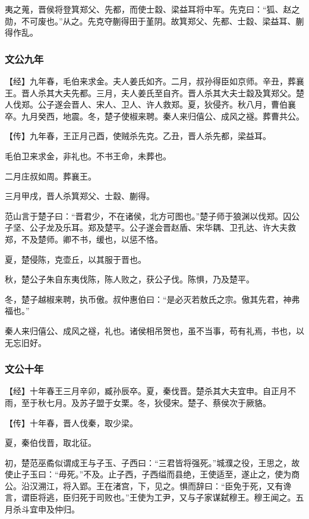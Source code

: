 \documentclass[]{article}
\begin{document}
夷之蒐，晋侯将登箕郑父、先都，而使士縠、梁益耳将中军。先克曰：``狐、赵之勋，不可废也。''从之。先克夺蒯得田于堇阴。故箕郑父、先都、士縠、梁益耳、蒯得作乱。

\hypertarget{header-n1149}{%
\subsubsection{文公九年}\label{header-n1149}}

【经】九年春，毛伯来求金。夫人姜氏如齐。二月，叔孙得臣如京师。辛丑，葬襄王。晋人杀其大夫先都。三月，夫人姜氏至自齐。晋人杀其大夫士縠及箕郑父。楚人伐郑。公子遂会晋人、宋人、卫人、许人救郑。夏，狄侵齐。秋八月，曹伯襄卒。九月癸西，地震。冬，楚子使椒来聘。秦人来归僖公、成风之襚。葬曹共公。

【传】九年春，王正月己酉，使贼杀先克。乙丑，晋人杀先都，梁益耳。

毛伯卫来求金，非礼也。不书王命，未葬也。

二月庄叔如周。葬襄王。

三月甲戌，晋人杀箕郑父、士縠、蒯得。

范山言于楚子曰：``晋君少，不在诸侯，北方可图也。''楚子师于狼渊以伐郑。囚公子坚、公子龙及乐耳。郑及楚平。公子遂会晋赵盾、宋华耦、卫孔达、许大夫救郑，不及楚师。卿不书，缓也，以惩不恪。

夏，楚侵陈，克壶丘，以其服于晋也。

秋，楚公子朱自东夷伐陈，陈人败之，获公子伐。陈惧，乃及楚平。

冬，楚子越椒来聘，执币傲。叔仲惠伯曰：``是必灭若敖氏之宗。傲其先君，神弗福也。''

秦人来归僖公、成风之襚，礼也。诸侯相吊贺也，虽不当事，苟有礼焉，书也，以无忘旧好。

\hypertarget{header-n1162}{%
\subsubsection{文公十年}\label{header-n1162}}

【经】十年春王三月辛卯，臧孙辰卒。夏，秦伐晋。楚杀其大夫宜申。自正月不雨，至于秋七月。及苏子盟于女栗。冬，狄侵宋。楚子、蔡侯次于厥貉。

【传】十年春，晋人伐秦，取少梁。

夏，秦伯伐晋，取北征。

初，楚范巫矞似谓成王与子玉、子西曰：``三君皆将强死。''城濮之役，王思之，故使止子玉曰：``毋死。''不及。止子西，子西缢而县绝，王使适至，遂止之，使为商公。沿汉溯江，将入郢。王在渚宫，下，见之。惧而辞曰：``臣免于死，又有谗言，谓臣将逃，臣归死于司败也。''王使为工尹，又与子家谋弑穆王。穆王闻之。五月杀斗宜申及仲归。
\end{document}
